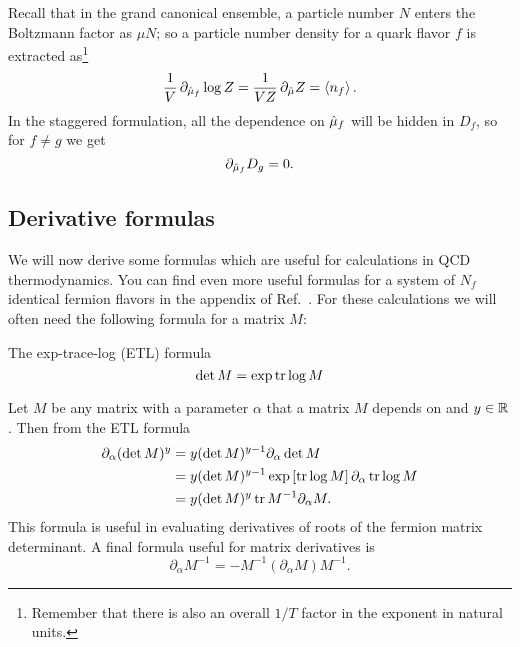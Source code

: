 Recall that in the grand canonical ensemble, a particle number
$N$ enters the Boltzmann factor as $\mu N$; so a particle number density 
for a quark flavor $f$ is extracted as\footnote{Remember that there is also
an overall $1/T$ factor in the exponent in natural units.}
\begin{equation}\label{eq:nfdensity}
  \frac{1}{V}\,\partial_{\muh_f}\log Z
  =\frac{1}{VZ}\,\partial_{\muh} Z
  =\ev{n_f}.
\end{equation}
In the staggered formulation, all the dependence on $\hat{\mu}_f$ will be
hidden in $D_f$, so for $f\neq g$ we get
\begin{equation}
  \partial_{\hat{\mu}_f}D_g = 0.
\end{equation}

\subsection{Derivative formulas}

We will now derive some formulas which are useful for calculations in QCD
thermodynamics. You can find even more useful formulas for a system of 
$N_f$ identical
fermion flavors in the appendix of Ref.~\cite{allton_thermodynamics_2005}.
For these calculations we will often need the following formula for a
matrix $M$:
\begin{theorem}{The exp-trace-log (ETL) formula}{}\label{thm:exptrlog} 
  $$\det M = \exp \tr \log M$$
\end{theorem}
Let $M$ be any matrix with a parameter $\alpha$ that a matrix 
$M$ depends on and $y\in\mathbb{R}$. Then from the ETL formula
\begin{equation}\begin{aligned}
  \partial_\alpha(\det M)^y &= y(\det M)^{y-1}\partial_\alpha\det M\\
      &= y(\det M)^{y-1}\exp\left[\tr\log M\right]\partial_\alpha\tr\log M\\
      &= y(\det M)^y \tr M^{-1}\partial_\alpha M.
\end{aligned}\end{equation}
This formula is useful in evaluating derivatives of roots of the fermion
matrix determinant. A final formula useful for matrix derivatives is
\begin{equation}
  \partial_\alpha M^{-1} = - M^{-1}\left(\partial_\alpha M\right) M^{-1}.
\end{equation}

